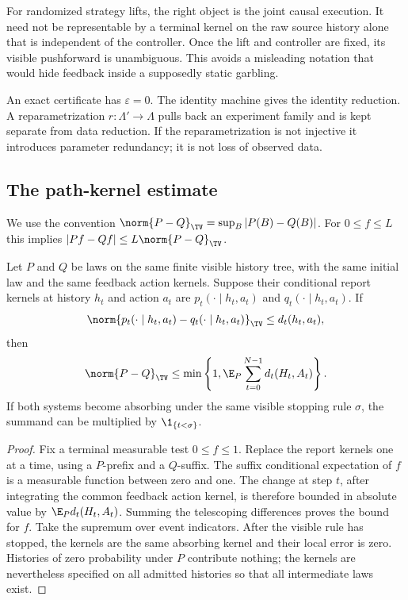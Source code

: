 For randomized strategy lifts, the right object is the joint causal
execution. It need not be representable by a terminal kernel on the raw
source history alone that is independent of the controller. Once the lift
and controller are fixed, its visible pushforward is unambiguous. This
avoids a misleading notation that would hide feedback inside a supposedly
static garbling.

An exact certificate has $\varepsilon=0$. The identity machine gives the
identity reduction. A reparametrization $r:\Lambda'\to\Lambda$ pulls back
an experiment family and is kept separate from data reduction. If the
reparametrization is not injective it introduces parameter redundancy;
it is not loss of observed data.

\subsection{The path-kernel estimate}
We use the convention
$\norm{P-Q}_{\TV}=\sup_B|P(B)-Q(B)|$. For $0\le f\le L$ this implies
$|Pf-Qf|\le L\norm{P-Q}_{\TV}$.

\begin{lemma}\label{lem:telescoping}
Let $P$ and $Q$ be laws on the same finite visible history tree, with the
same initial law and the same feedback action kernels. Suppose their
conditional report kernels at history $h_t$ and action $a_t$ are
$p_t(\cdot\mid h_t,a_t)$ and $q_t(\cdot\mid h_t,a_t)$. If
\[
 \norm{p_t(\cdot\mid h_t,a_t)-q_t(\cdot\mid h_t,a_t)}_{\TV}
 \le d_t(h_t,a_t),
\]
then
\begin{equation}\label{eq:telescoping}
 \norm{P-Q}_{\TV}
 \le\min\left\{1,\E_P\sum_{t=0}^{N-1}d_t(H_t,A_t)\right\}.
\end{equation}
If both systems become absorbing under the same visible stopping rule
$\sigma$, the summand can be multiplied by $\1_{\{t<\sigma\}}$.
\end{lemma}
\begin{proof}
Fix a terminal measurable test $0\le f\le1$. Replace the report kernels
one at a time, using a $P$-prefix and a $Q$-suffix. The suffix conditional
expectation of $f$ is a measurable function between zero and one. The
change at step $t$, after integrating the common feedback action kernel,
is therefore bounded in absolute value by
$\E_P d_t(H_t,A_t)$. Summing the telescoping differences proves the bound
for $f$. Take the supremum over event indicators. After the visible rule
has stopped, the kernels are the same absorbing kernel and their local
error is zero. Histories of zero probability under $P$ contribute nothing;
the kernels are nevertheless specified on all admitted histories so that
all intermediate laws exist.
\end{proof}

